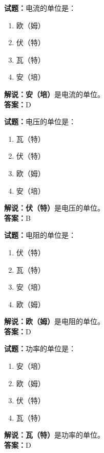 \documentclass{ctexbook}
\begin{document}
\noindent\textbf{试题：}电流的单位是：

\begin{enumerate}[leftmargin=3em]
	\item 欧（姆）
	\item 伏（特）
	\item 瓦（特）
	\item 安（培）
\end{enumerate}

\noindent\textbf{解说：}\textbf{安（培）}是电流的单位。\\\noindent\textbf{答案：}D


\bigskip


\noindent\textbf{试题：}电压的单位是：

\begin{enumerate}[leftmargin=3em]
	\item 瓦（特）
	\item 伏（特）
	\item 欧（姆）
	\item 安（培）
\end{enumerate}

\noindent\textbf{解说：伏（特）}是电压的单位。\\\noindent\textbf{答案：}B


\bigskip


\noindent\textbf{试题：}电阻的单位是：

\begin{enumerate}[leftmargin=3em]
	\item 伏（特）
	\item 瓦（特）
	\item 安（培）
	\item 欧（姆）
\end{enumerate}

\noindent\textbf{解说：欧（姆）}是电阻的单位。\\\noindent\textbf{答案：}D


\bigskip


\noindent\textbf{试题：}功率的单位是：

\begin{enumerate}[leftmargin=3em]
	\item 安（培）
	\item 欧（姆）
	\item 伏（特）
	\item 瓦（特）
\end{enumerate}

\noindent\textbf{解说：瓦（特）}是功率的单位。\\\noindent\textbf{答案：}D
\end{document}
